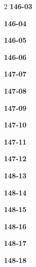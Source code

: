 \documentclass[10pt,a4paper]{article}
\begin{document}
\begin{multicols}{2}
\noindent\textbf{146-03}\ \par
\noindent\textbf{146-04}\ \par
\noindent\textbf{146-05}\ \par
\noindent\textbf{146-06}\ \par
\noindent\textbf{147-07}\ \par
\noindent\textbf{147-08}\ \par
\noindent\textbf{147-09}\ \par
\noindent\textbf{147-10}\ \par
\noindent\textbf{147-11}\ \par
\noindent\textbf{147-12}\ \par
\noindent\textbf{148-13}\ \par
\noindent\textbf{148-14}\ \par
\noindent\textbf{148-15}\ \par
\noindent\textbf{148-16}\ \par
\noindent\textbf{148-17}\ \par
\noindent\textbf{148-18}\ \par
\end{multicols}
\end{document}
